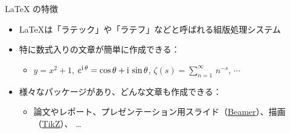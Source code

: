 \documentclass[dvipdfmx]{beamer}
\begin{document}
\begin{frame}[fragile]{\LaTeX{} の特徴}
\begin{itemize}
\item \LaTeX は「ラテック」や「ラテフ」などと呼ばれる組版処理システム
%
\bigskip
\item 特に数式入りの文章が簡単に作成できる：
    \begin{itemize}
        \item $y=x^2 + 1$, $e^{\mathrm{i}\,\theta} = \cos\theta + \mathrm{i}\,\sin\theta$, $\zeta(s) = \sum_{n=1}^\infty\,n^{-s}$, $\cdots$
    \end{itemize}
%
\bigskip
\item 様々なパッケージがあり、どんな文章も作成できる：
    \begin{itemize}
    \item 論文やレポート、プレゼンテーション用スライド（\href{https://www.overleaf.com/learn/latex/Beamer}{Beamer}）、描画（\href{https://www.overleaf.com/learn/latex/TikZ_package}{TikZ}）、 \ldots
    \end{itemize}
\begin{center}
\qquad
{}
\end{center}
\end{itemize}
\end{frame}
\end{document}
